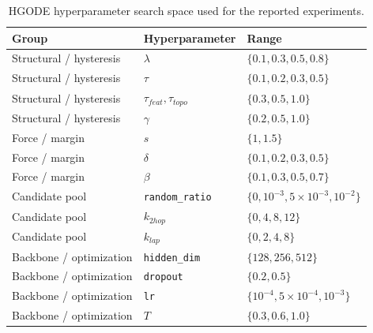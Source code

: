 \documentclass{article}
\theoremstyle{plain}
\theoremstyle{definition}
\theoremstyle{remark}
\begin{document}
\begin{table}[H]
    \caption{HGODE hyperparameter search space used for the reported experiments.}
    \label{tab:hparam_ranges}
    \centering
    {\footnotesize
        \setlength{\tabcolsep}{4pt}
        \renewcommand{\arraystretch}{1.05}
        \begin{tabular}{p{}p{}p{}}
            \toprule
            Group                   & Hyperparameter              & Range                                       \\
            \midrule
            Structural / hysteresis & $\lambda$                   & $\{0.1,0.3,0.5,0.8\}$                      \\
            Structural / hysteresis & $\tau$                      & $\{0.1,0.2,0.3,0.5\}$                      \\
            Structural / hysteresis & $\tau_{feat},\tau_{topo}$   & $\{0.3,0.5,1.0\}$                          \\
            Structural / hysteresis & $\gamma$                    & $\{0.2,0.5,1.0\}$                          \\
            Force / margin          & $s$                         & $\{1,1.5\}$                                \\
            Force / margin          & $\delta$                    & $\{0.1,0.2,0.3,0.5\}$                      \\
            Force / margin          & $\beta$                     & $\{0.1,0.3,0.5,0.7\}$                      \\
            Candidate pool          & \texttt{random\_ratio}      & $\{0,10^{-3},5{\times}10^{-3},10^{-2}\}$   \\
            Candidate pool          & $k_{2hop}$                  & $\{0,4,8,12\}$                             \\
            Candidate pool          & $k_{lap}$                   & $\{0,2,4,8\}$                              \\
            Backbone / optimization & \texttt{hidden\_dim}        & $\{128,256,512\}$                          \\
            Backbone / optimization & \texttt{dropout}            & $\{0.2,0.5\}$                              \\
            Backbone / optimization & \texttt{lr}                 & $\{10^{-4},5{\times}10^{-4},10^{-3}\}$     \\
            Backbone / optimization & $T$                         & $\{0.3,0.6,1.0\}$                          \\
            \bottomrule
        \end{tabular}}
\end{table}
\end{document}
